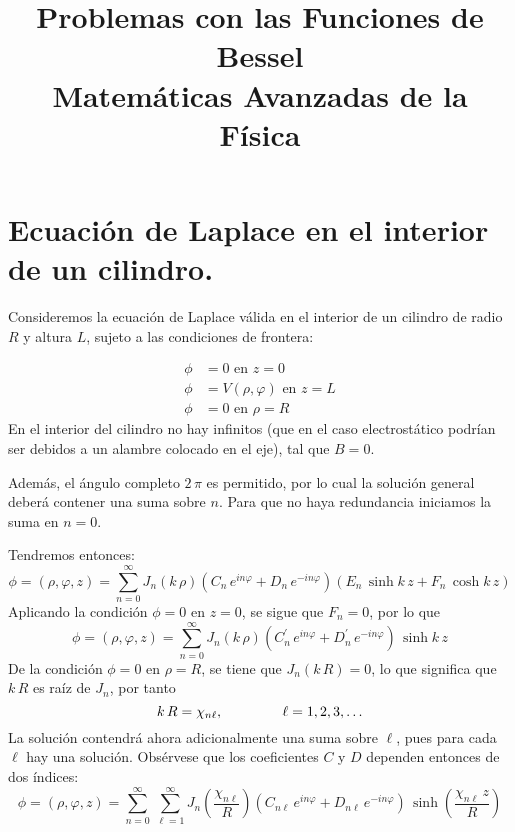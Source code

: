 
\title{Problemas con las Funciones de Bessel \\ {\large Matemáticas Avanzadas de la Física}}
\date{ }

\maketitle
\fontsize{14}{14}\selectfont
\section{Ecuación de Laplace en el interior de un cilindro.}
Consideremos la ecuación de Laplace válida en el interior de un cilindro de radio $R$ y altura $L$, sujeto a las condiciones de frontera:
\begin{figure}[H]
    \centering
    
\end{figure}
\begin{align*}
\phi &= 0 \mbox{ en } z = 0 \\
\phi &= V (\rho, \varphi) \mbox{ en  } z = L \\
\phi &= 0 \mbox{ en } \rho = R
\end{align*}
En el interior del cilindro no hay infinitos (que en el caso electrostático podrían ser debidos a un alambre colocado en el eje), tal que $B = 0$.
\par
Además, el ángulo completo $2 \, \pi$ es permitido, por lo cual la solución general deberá contener una suma sobre $n$. Para que no haya redundancia iniciamos la suma en $n = 0$.
\par
Tendremos entonces:
\[ \phi = (\rho, \varphi, z) =  \sum_{n=0}^{\infty} J_{n} (k \, \rho) (C_{n} \, e^{i n \varphi} +  D_{n} \, e^{-i n \varphi})(E_{n} \, \sinh k \, z + F_{n} \, \cosh k \, z) \]
Aplicando la condición $\phi=0$ en $z=0$, se sigue que $F_{n}=0$, por lo que
\[ \phi = (\rho, \varphi, z) =  \sum_{n=0}^{\infty} J_{n} (k \, \rho) (C_{n}^{\prime} \, e^{i n \varphi} +  D_{n}^{\prime} \, e^{-i n \varphi}) \,  \sinh k \, z \]
De la condición $\phi=0$ en $\rho = R$, se tiene que $J_{n} (k \, R) = 0$, lo que significa que $k \, R$ es raíz de $J_{n}$, por tanto
\[ k \, R = \chi_{n \ell}, \hspace{1.5cm} \ell = 1, 2, 3, \ldots \]
La solución contendrá ahora adicionalmente una suma sobre $\ell$, pues para cada $\ell$ hay una solución. Obsérvese que los coeficientes $C$ y $D$ dependen entonces de dos índices:
\[ \phi = (\rho, \varphi, z) =  \sum_{n=0}^{\infty} \, \sum_{\ell=1}^{\infty} J_{n} \left( \dfrac{\chi_{n \ell}}{R} \right)\left( C_{n \ell} \, e^{i n \varphi} +  D_{n \ell} \, e^{-i n \varphi} \right) \, \sinh \left( \dfrac{\chi_{n \ell} \, z}{R} \right) \]
